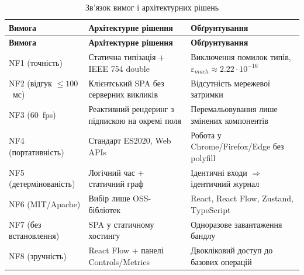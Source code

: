 \begin{longtable}[]{@{}
  >{\raggedright\arraybackslash}p{}
  >{\raggedright\arraybackslash}p{}
  >{\raggedright\arraybackslash}p{}@{}}
\caption{\protect{}\label{tab:req_to_tech}{}Зв'язок вимог і
архітектурних рішень}\tabularnewline
\toprule\noalign{}
\begin{minipage}[b]{\linewidth}\raggedright
\textbf{Вимога}
\end{minipage} & \begin{minipage}[b]{\linewidth}\raggedright
\textbf{Архітектурне рішення}
\end{minipage} & \begin{minipage}[b]{\linewidth}\raggedright
\textbf{Обґрунтування}
\end{minipage} \\
\midrule\noalign{}
\endfirsthead
\toprule\noalign{}
\begin{minipage}[b]{\linewidth}\raggedright
\textbf{Вимога}
\end{minipage} & \begin{minipage}[b]{\linewidth}\raggedright
\textbf{Архітектурне рішення}
\end{minipage} & \begin{minipage}[b]{\linewidth}\raggedright
\textbf{Обґрунтування}
\end{minipage} \\
\midrule\noalign{}
\endhead
\bottomrule\noalign{}
\endlastfoot
NF1 (точність) & Статична типізація + IEEE 754 double & Виключення
помилок типів, \(\varepsilon_{mach} \approx 2.22 \cdot 10^{- 16}\) \\
NF2 (відгук \(\leq 100\)~мс) & Клієнтський SPA без серверних викликів &
Відсутність мережевої затримки \\
NF3 (60~fps) & Реактивний рендеринг з підпискою на окремі поля &
Перемальовування лише змінених компонентів \\
NF4 (портативність) & Стандарт ES2020, Web APIs & Робота у
Chrome/Firefox/Edge без polyfill \\
NF5 (детермінованість) & Логічний час + статичний граф & Ідентичні входи
\(\Rightarrow\) ідентичний журнал \\
NF6 (MIT/Apache) & Вибір лише OSS-бібліотек & React, React Flow,
Zustand, TypeScript \\
NF7 (без встановлення) & SPA у статичному хостингу & Одноразове
завантаження бандлу \\
NF8 (зручність) & React Flow + панелі Controls/Metrics & Двокліковий
доступ до базових операцій \\
\end{longtable}

